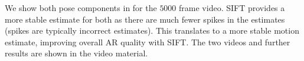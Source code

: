 We show both pose components in  for the $5000$ frame video. SIFT provides a more stable estimate for both as there are much fewer spikes in the estimates (spikes are typically incorrect estimates). This translates to a more stable motion estimate, improving overall AR quality with SIFT.
The two videos and further results are shown in the video material. 

